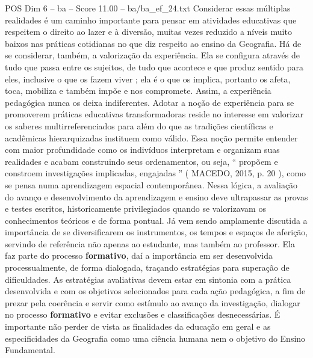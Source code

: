 \begin{textsample}{POS Dim 6 – ba – Score 11.00 – ba/ba\_ef\_24.txt}
Considerar essas múltiplas realidades é um caminho importante para pensar em atividades educativas que respeitem o direito ao lazer e à diversão, muitas vezes reduzido a níveis muito baixos nas práticas cotidianas no que diz respeito ao ensino da Geografia.
Há de se considerar, também, a valorização da experiência.
Ela se configura através de tudo que passa entre os sujeitos, de tudo que acontece e que produz sentido para eles, inclusive o que os fazem viver ; ela é o que os implica, portanto os afeta, toca, mobiliza e também impõe e nos compromete.
Assim, a experiência pedagógica nunca os deixa indiferentes.
Adotar a noção de experiência para se promoverem práticas educativas transformadoras reside no interesse em valorizar os saberes multirreferenciados para além do que as tradições científicas e acadêmicas hierarquizadas instituem como válido.
Essa noção permite entender com maior profundidade como os indivíduos interpretam e organizam suas realidades e acabam construindo seus ordenamentos, ou seja, “ propõem e constroem investigações implicadas, engajadas ” ( MACEDO, 2015, p. 20 ), como se pensa numa aprendizagem espacial contemporânea.
Nessa lógica, a avaliação do avanço e desenvolvimento da aprendizagem e ensino deve ultrapassar as provas e testes escritos, historicamente privilegiados quando se valorizavam os conhecimentos teóricos e de forma pontual.
Já vem sendo amplamente discutida a importância de se diversificarem os instrumentos, os tempos e espaços de aferição, servindo de referência não apenas ao estudante, mas também ao professor.
Ela faz parte do processo \textbf{formativo}, daí a importância em ser desenvolvida processualmente, de forma dialogada, traçando estratégias para superação de dificuldades.
As estratégias avaliativas devem estar em sintonia com a prática desenvolvida e com os objetivos selecionados para cada ação pedagógica, a fim de prezar pela coerência e servir como estímulo ao avanço da investigação, dialogar no processo \textbf{formativo} e evitar exclusões e classificações desnecessárias.
É importante não perder de vista as finalidades da educação em geral e as especificidades da Geografia como uma ciência humana nem o objetivo do Ensino Fundamental.

\end{textsample}
